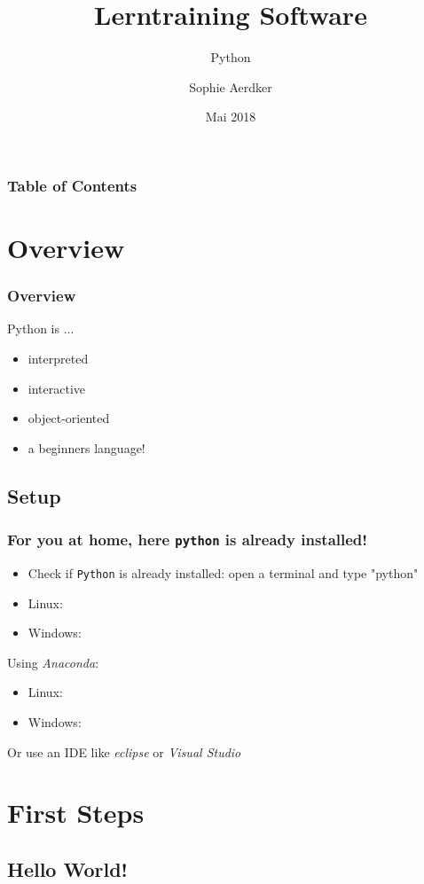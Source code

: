 \documentclass{beamer}
\title{Lerntraining Software}
\subtitle{Python}
\author{Sophie Aerdker}
\institute{Ruhr-Universit\"at Bochum}
\date{Mai 2018}
\begin{document}
 
\frame{\titlepage}
\begin{frame}
\frametitle{Table of Contents}
	\tableofcontents
\end{frame}

\section{Overview}

\begin{frame}
\frametitle{Overview}
	Python is ...\\
	\begin{itemize}
		\item interpreted
		\item interactive 
		\item object-oriented 
		\item a beginners language!
	\end{itemize}
\end{frame}

\subsection{Setup}

\begin{frame}
\frametitle{For you at home, here \texttt{python} is already installed!}
	\begin{itemize}
		\item Check if \texttt{Python} is already installed: open a terminal and type "python"
		\item Linux:
		\item Windows:
	\end{itemize}
	Using \textit{Anaconda}:
	\begin{itemize}
		\item Linux:
		\item Windows:
	\end{itemize}
	Or use an IDE like \textit{eclipse} or \textit{Visual Studio}
\end{frame}

\section{First Steps}
\subsection{Hello World!}
\end{document}
